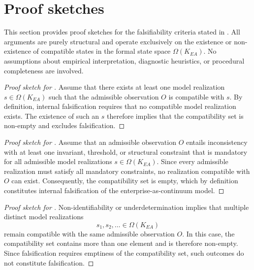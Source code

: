 ﻿\section{Proof sketches}

This section provides proof sketches for the falsifiability criteria stated
in .
All arguments are purely structural and operate exclusively on the
existence or non-existence of compatible states in the formal state space
\(\Omega(K_{EA})\).
No assumptions about empirical interpretation, diagnostic heuristics, or
procedural completeness are involved.

\medskip

\begin{proof}[Proof sketch for ]
Assume that there exists at least one model realization
\(s \in \Omega(K_{EA})\) such that the admissible observation \(O\) is
compatible with \(s\).
By definition, internal falsification requires that no compatible model
realization exists.
The existence of such an \(s\) therefore implies that the compatibility
set is non-empty and excludes falsification.
\end{proof}

\medskip

\begin{proof}[Proof sketch for ]
Assume that an admissible observation \(O\) entails inconsistency with at
least one invariant, threshold, or structural constraint that is mandatory
for all admissible model realizations
\(s \in \Omega(K_{EA})\).
Since every admissible realization must satisfy all mandatory constraints,
no realization compatible with \(O\) can exist.
Consequently, the compatibility set is empty, which by definition
constitutes internal falsification of the enterprise-as-continuum model.
\end{proof}

\medskip

\begin{proof}[Proof sketch for ]
Non-identifiability or underdetermination implies that multiple distinct
model realizations
\[
s_1, s_2, \dots \in \Omega(K_{EA})
\]
remain compatible with the same admissible observation \(O\).
In this case, the compatibility set contains more than one element and is
therefore non-empty.
Since falsification requires emptiness of the compatibility set, such
outcomes do not constitute falsification.
\end{proof}


